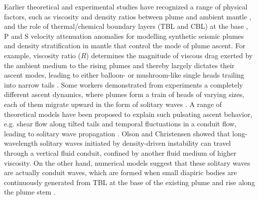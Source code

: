 \documentclass[12pt]{article}
\begin{document}
Earlier theoretical and experimental studies have recognized a range of  physical factors, such as viscosity and density ratios between plume and ambient mantle \cite{olson1985creeping, whitehead1986buoyancy, griffiths1990stirring, jellinek1999mixing, farnetani2002mixing, dutta2013ballooning, dutta2014ascent}, and the role of thermal/chemical boundary layers  (TBL and CBL) at the base \cite{davaille2005transient, lin2006dynamics1, lin2006dynamics2}, P and S velocity attenuation anomalies for modelling synthetic seismic plumes \cite{goes2004synthetic} and density stratification in mantle \cite{dannberg2015low} that control the mode of plume ascent. For example, viscosity ratio ($R$) determines the magnitude of viscous drag exerted by the ambient medium to the rising plumes and thereby largely dictates their ascent modes, leading to either balloon- or mushroom-like single heads trailing into narrow tails \cite{olson1985creeping, dutta2013ballooning, dutta2014ascent}. Some workers demonstrated from experiments a completely different ascent dynamics, where plumes form a train of heads of varying sizes, each of them migrate upward in the form of solitary waves \cite{scott1986observations, olson1986solitary}. A range of theoretical models have been proposed to explain such pulsating ascent behavior, e.g. shear flow along tilted tails \cite{skilbeck1978formation} and temporal fluctuations in a conduit flow, leading to solitary wave propagation \cite{scott1986observations, olson1986solitary, schubert1989solitary}. Olson and Christensen \cite{olson1986solitary} showed that long-wavelength solitary waves initiated by density-driven instability can travel through a vertical fluid conduit, confined by another fluid medium of higher viscosity. On the other hand, numerical models suggest that these solitary waves are actually conduit waves, which are formed when small diapiric bodies are continuously generated from TBL at the base of the existing plume and rise along the plume stem \cite{schubert1989solitary}.
\end{document}
